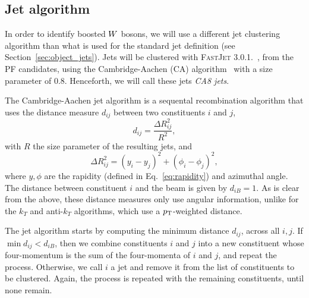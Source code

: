 \subsection{Jet algorithm}

In order to identify boosted $W$ bosons,  we will use a different jet clustering algorithm
than what is used for the standard jet definition (see Section~\ref{sec:object_jets}). 
Jets will be clustered with \textsc{FastJet 3.0.1.}~\cite{Cacciari:2011ma}, from the PF candidates,
using the Cambridge-Aachen (CA) algorithm~\cite{Dokshitzer:1997in} with a size parameter of 0.8.
Henceforth, we will call these jets \textit{CA8 jets}. 

\begin{cajet} \theoremstyle{definition}
The Cambridge-Aachen jet algorithm is a sequental recombination algorithm that uses the
distance measure $d_{ij}$ between two constituents $i$ and $j$,
\begin{equation}
d_{ij} = \frac{\Delta R_{ij}^2}{R^2}, \label{eq:CA_distance}
\end{equation}
with $R$ the size parameter of the resulting jets, and
\begin{equation}
\Delta R_{ij}^2 = (y_i - y_j)^2 + (\phi_i - \phi_j)^2 ,
\label{eq:DeltaR_jet_algo}
\end{equation}
where $y, \phi$ are the rapidity (defined in Eq.~\ref{eq:rapidity}) and azimuthal angle. 
The distance between constituent $i$ and the beam is given by $d_{iB} = 1$.
As is clear from the above, these distance measures only use angular information, unlike for the
$k_T$ and anti-$k_T$ algorithms, which use a $p_{\mathrm{T}}$-weighted distance. 

The jet algorithm starts by computing the minimum distance $d_{ij}$, across all $i,j$. If $\min
d_{ij} < d_{iB}$, then we combine constituents $i$ and $j$ into a new constituent whose
four-momentum is the sum of the four-momenta of $i$ and $j$, and repeat the process. Otherwise, we
call $i$ a jet and remove it from the list of constituents to be clustered. Again, the process is
repeated with the remaining constituents, until none remain.
\end{cajet}

